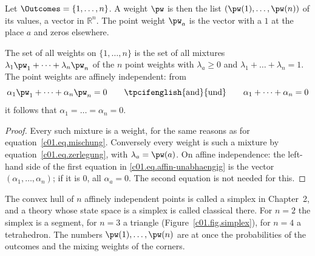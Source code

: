 \begin{vertiefung}[id=c01.v1,
    titel={The set of all preparations is a simplex},
    wozu={The Core shows that every weight is uniquely mixed from point weights. Here this
      becomes a picture: for $n$ outcomes the weights form a segment, a triangle, a
      tetrahedron and so on, and the point weights are the corners.},
    voraussetzung={Section~\ref{c01.s3.1}; vectors in $\mathbb{R}^n$. The rest of this
      chapter does not need the block; Chapter~2 takes up the picture.},
    zurueck={The weights on $n$ outcomes form a body with $n$ corners, the point weights;
      every point in it is mixed from the corners in exactly one way.}]
  Let $\Outcomes = \{1, \dots, n\}$. A weight $\pw$ is then the list
  $(\pw(1), \dots, \pw(n))$ of its values, a vector in $\mathbb{R}^n$. The point weight
  $\pw_a$ is the vector with a $1$ at the place $a$ and zeros elsewhere.

  \begin{proposition}\label{c01.prop.simplex}
    The set of all weights on $\{1, \dots, n\}$ is the set of all mixtures
    $\lambda_1 \pw_1 + \dots + \lambda_n \pw_n$ of the $n$ point weights with
    $\lambda_a \geq 0$ and $\lambda_1 + \dots + \lambda_n = 1$. The point weights are
    affinely independent: from
    \begin{equation}\label{c01.eq.affin-unabhaengig}
      \alpha_1 \pw_1 + \dots + \alpha_n \pw_n = 0
      \qquad \text{\tpcifenglish{and}{und}} \qquad
      \alpha_1 + \dots + \alpha_n = 0
    \end{equation}
    it follows that $\alpha_1 = \dots = \alpha_n = 0$.
  \end{proposition}
  \begin{proof}
    Every such mixture is a weight, for the same reasons as for
    equation~\eqref{c01.eq.mischung}. Conversely every weight is such a mixture by
    equation~\eqref{c01.eq.zerlegung}, with $\lambda_a = \pw(a)$. On affine
    independence: the left-hand side of the first equation in
    \eqref{c01.eq.affin-unabhaengig} is the vector $(\alpha_1, \dots, \alpha_n)$; if it is
    $0$, all $\alpha_a = 0$. The second equation is not needed for this.
  \end{proof}

  The convex hull of $n$ affinely independent points is called a simplex in Chapter~2, and
  a theory whose state space is a simplex is called classical there. For $n = 2$ the
  simplex is a segment, for $n = 3$ a triangle (Figure~\ref{c01.fig.simplex}), for
  $n = 4$ a tetrahedron. The numbers $\pw(1), \dots, \pw(n)$ are at once the
  probabilities of the outcomes and the mixing weights of the corners.


\end{vertiefung}
